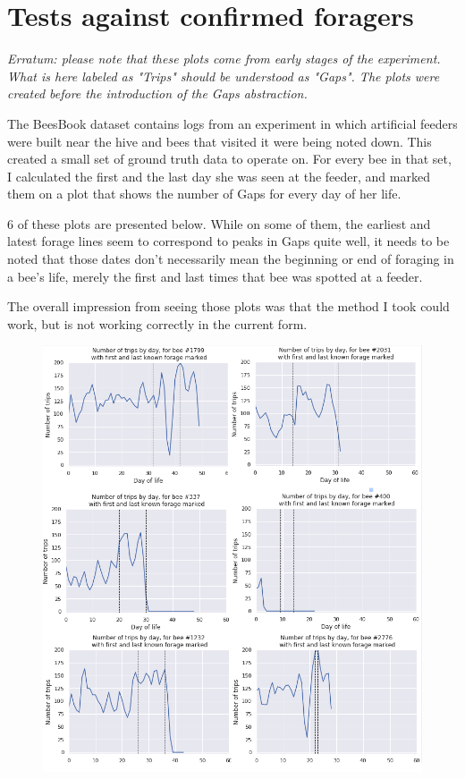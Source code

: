 \chapter{Tests against confirmed foragers} 

\textit{Erratum: please note that these plots come from early stages of the experiment. What is here labeled as "Trips" should be understood as "Gaps". The plots were created before the introduction of the Gaps abstraction.}


The BeesBook dataset contains logs from an experiment in which artificial feeders were built near the hive and bees that visited it were being noted down. This created a small set of ground truth data to operate on. For every bee in that set, I calculated the first and the last day she was seen at the feeder, and marked them on a plot that shows the number of Gaps for every day of her life. 

6 of these plots are presented below. While on some of them, the earliest and latest forage lines seem to correspond to peaks in Gaps quite well, it needs to be noted that those dates don't necessarily mean the beginning or end of foraging in a bee's life, merely the first and last times that bee was spotted at a feeder.

The overall impression from seeing those plots was that the method I took could work, but is not working correctly in the current form.





\clearpage
\begin{figure}[htbp!] 
\centering
\includegraphics[width=1.0\textwidth]{End-sections/Appendix1/forager-trips.png}
\label{fig:beedays-schlegel}
\end{figure}